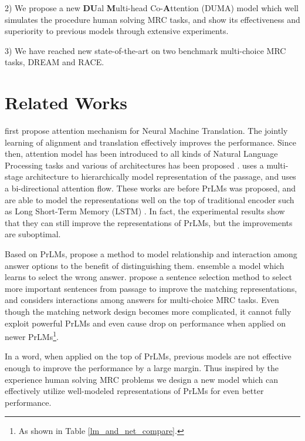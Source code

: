 \documentclass[letterpaper]{article} \usepackage{aaai21}  \usepackage{times}  \usepackage{helvet} \usepackage{courier}  \usepackage[hyphens]{url}  \usepackage{graphicx} \urlstyle{rm} \def\UrlFont{\rm}  \usepackage{natbib}  \usepackage{caption} \frenchspacing  \setlength{\pdfpagewidth}{8.5in}  \setlength{\pdfpageheight}{11in}
\begin{document}
2) We propose a new \textbf{DU}al \textbf{M}ulti-head Co-\textbf{A}ttention (DUMA) model which well simulates the procedure human solving MRC tasks, and show its effectiveness and superiority to previous models through extensive experiments.

3) We have reached new state-of-the-art on two benchmark multi-choice MRC tasks, DREAM and RACE.

\section{Related Works}\label{related}
\cite{nmt_attention} first propose attention mechanism for Neural Machine Translation. The jointly learning of alignment and translation effectively improves the performance. Since then, attention model has been introduced to all kinds of Natural Language Processing tasks and various of architectures has been proposed \cite{tu2020select,chen2019convolutional,gao2019generating,yan2019deep}. \cite{bidaf} uses a multi-stage architecture to hierarchically model representation of the passage, and uses a bi-directional attention flow. These works are before PrLMs was proposed, and are able to model the representations well on the top of traditional encoder such as Long Short-Term Memory (LSTM) \cite{lstm}. In fact, the experimental results show that they can still improve the representations of PrLMs, but the improvements are suboptimal. 

Based on PrLMs, \cite{ocn} propose a method to model relationship and interaction among answer options to the benefit of distinguishing them. \cite{bert_wae} ensemble a model which learns to select the wrong answer. \cite{dcmn} propose a sentence selection method to select more important sentences from passage to improve the matching representations, and considers interactions among answers for multi-choice MRC tasks. Even though the matching network design becomes more complicated, it cannot fully exploit powerful PrLMs and even cause drop on performance when applied on newer PrLMs\footnote{As shown in Table \ref{lm_and_net_compare}.}.

In a word, when applied on the top of PrLMs, previous models are not effective enough to improve the performance by a large margin. Thus inspired by the experience human solving MRC problems we design a new model which can effectively utilize well-modeled representations of PrLMs for even better performance.
\end{document}

